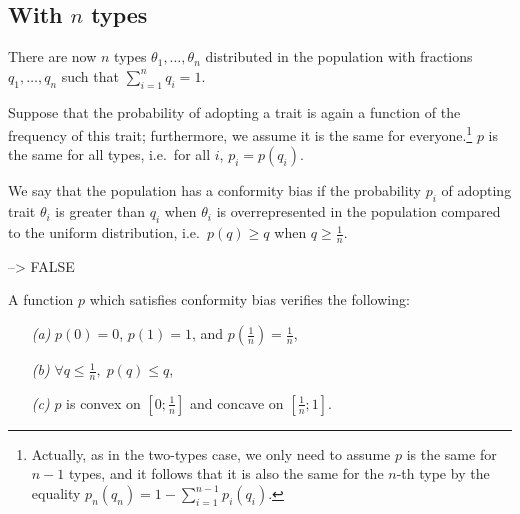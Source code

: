 \documentclass[12pt,a4paper]{article}		%
\begin{document}
\subsection{With $n$ types}

There are now $n$ types $\theta_1, \dots, \theta_n$ distributed in the population with fractions $q_1, \dots, q_n$ such that $\sum_{i = 1}^n q_i = 1$.

Suppose that the probability of adopting a trait is again a function of the frequency of this trait; furthermore, we assume it is the same for everyone.\footnote{Actually, as in the two-types case, we only need to assume $p$ is the same for $n-1$ types, and it follows that it is also the same for the $n$-th type by the equality $p_n(q_n) = 1 - \sum_{i = 1}^{n-1} p_i(q_i)$.} $p$ is the same for all types, i.e.\ for all $i$, $p_i = p(q_i)$.

\begin{rev-def} We say that the population has a conformity bias if the probability $p_i$ of adopting trait $\theta_i$ is greater than $q_i$ when $\theta_i$ is overrepresented in the population compared to the uniform distribution, i.e.\ $p(q) \geq q$ when $q \geq \frac{1}{n}$.
\end{rev-def} –> FALSE

\begin{rev-cons} A function $p$ which satisfies conformity bias verifies the following: \begin{enumerate}
	\item[\itshape (a)] $p(0) = 0$, $p(1) = 1$, and $p(\frac{1}{n}) = \frac{1}{n}$,
	\item[\itshape (b)] $\forall q \leq \frac{1}{n}, \; p(q) \leq q$,
	\item[\itshape (c)] $p$ is convex on $[0; \frac{1}{n}]$ and concave on $[\frac{1}{n}; 1]$.
	\end{enumerate}
\end{rev-cons}
\end{document}
